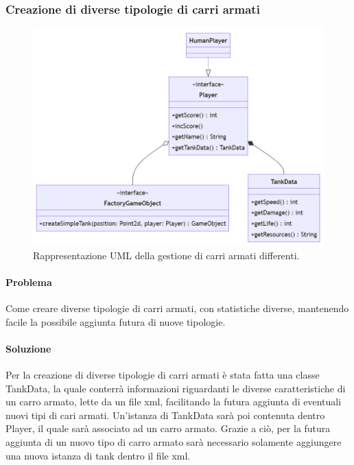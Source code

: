 \documentclass[a4paper,12pt]{report}
\begin{document}
\subsubsection*{Creazione di diverse tipologie di carri armati}
%
\begin{figure}[H]
	\centering{}
	\includegraphics[scale=0.75]{img/tankData.png}
	\caption{Rappresentazione UML della gestione di carri armati differenti.}
	\label{img:strategy}
	\end{figure}
%	
\paragraph*{Problema} Come creare diverse tipologie di carri armati, con statistiche diverse, mantenendo facile la possibile aggiunta futura di nuove tipologie.
%
\paragraph*{Soluzione} Per la creazione di diverse tipologie di carri armati è stata fatta una classe TankData, la quale conterrà informazioni riguardanti le diverse caratteristiche di un carro armato, lette da un file xml, facilitando la futura aggiunta di eventuali nuovi tipi di cari armati. Un’istanza di TankData sarà poi contenuta dentro Player, il quale sarà associato ad un carro armato. Grazie a ciò, per la futura aggiunta di un nuovo tipo di carro armato sarà necessario solamente aggiungere una nuova istanza di tank dentro il file xml.
%
\newpage
\end{document}
